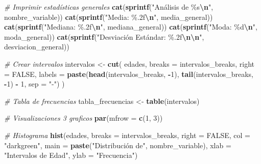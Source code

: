 \documentclass[
]{article}
\newenvironment{Shaded}{\begin{snugshade}}{\end{snugshade}}
\newcommand{\AttributeTok}[1]{\textcolor[rgb]{0.13,0.29,0.53}{#1}}
\newcommand{\CommentTok}[1]{\textcolor[rgb]{0.56,0.35,0.01}{\textit{#1}}}
\newcommand{\ConstantTok}[1]{\textcolor[rgb]{0.56,0.35,0.01}{#1}}
\newcommand{\DecValTok}[1]{\textcolor[rgb]{0.00,0.00,0.81}{#1}}
\newcommand{\FunctionTok}[1]{\textcolor[rgb]{0.13,0.29,0.53}{\textbf{#1}}}
\newcommand{\NormalTok}[1]{#1}
\newcommand{\OtherTok}[1]{\textcolor[rgb]{0.56,0.35,0.01}{#1}}
\newcommand{\SpecialCharTok}[1]{\textcolor[rgb]{0.81,0.36,0.00}{\textbf{#1}}}
\newcommand{\StringTok}[1]{\textcolor[rgb]{0.31,0.60,0.02}{#1}}
\begin{document}
\begin{Shaded}
\begin{Highlighting}[]
  \CommentTok{\# Imprimir estadísticas generales}
  \FunctionTok{cat}\NormalTok{(}\FunctionTok{sprintf}\NormalTok{(}\StringTok{"Análisis de \%s}\SpecialCharTok{\textbackslash{}n}\StringTok{"}\NormalTok{, nombre\_variable))}
  \FunctionTok{cat}\NormalTok{(}\FunctionTok{sprintf}\NormalTok{(}\StringTok{"Media: \%.2f}\SpecialCharTok{\textbackslash{}n}\StringTok{"}\NormalTok{, media\_general))}
  \FunctionTok{cat}\NormalTok{(}\FunctionTok{sprintf}\NormalTok{(}\StringTok{"Mediana: \%.2f}\SpecialCharTok{\textbackslash{}n}\StringTok{"}\NormalTok{, mediana\_general))}
  \FunctionTok{cat}\NormalTok{(}\FunctionTok{sprintf}\NormalTok{(}\StringTok{"Moda: \%d}\SpecialCharTok{\textbackslash{}n}\StringTok{"}\NormalTok{, moda\_general))}
  \FunctionTok{cat}\NormalTok{(}\FunctionTok{sprintf}\NormalTok{(}\StringTok{"Desviación Estándar: \%.2f}\SpecialCharTok{\textbackslash{}n\textbackslash{}n}\StringTok{"}\NormalTok{, desviacion\_general))}
  
  
  \CommentTok{\# Crear intervalos}
\NormalTok{  intervalos }\OtherTok{\textless{}{-}} \FunctionTok{cut}\NormalTok{(}
\NormalTok{    edades, }
    \AttributeTok{breaks =}\NormalTok{ intervalos\_breaks, }
    \AttributeTok{right =} \ConstantTok{FALSE}\NormalTok{, }
    \AttributeTok{labels =} \FunctionTok{paste}\NormalTok{(}\FunctionTok{head}\NormalTok{(intervalos\_breaks, }\SpecialCharTok{{-}}\DecValTok{1}\NormalTok{), }\FunctionTok{tail}\NormalTok{(intervalos\_breaks, }\SpecialCharTok{{-}}\DecValTok{1}\NormalTok{) }\SpecialCharTok{{-}} \DecValTok{1}\NormalTok{, }\AttributeTok{sep =} \StringTok{"{-}"}\NormalTok{)}
\NormalTok{  )}
  
  \CommentTok{\# Tabla de frecuencias}
\NormalTok{  tabla\_frecuencias }\OtherTok{\textless{}{-}} \FunctionTok{table}\NormalTok{(intervalos)}
  
  \CommentTok{\# Visualizaciones 3 graficos}
  \FunctionTok{par}\NormalTok{(}\AttributeTok{mfrow =} \FunctionTok{c}\NormalTok{(}\DecValTok{1}\NormalTok{, }\DecValTok{3}\NormalTok{))}
  
  \CommentTok{\# Histograma}
  \FunctionTok{hist}\NormalTok{(edades, }
       \AttributeTok{breaks =}\NormalTok{ intervalos\_breaks, }
       \AttributeTok{right =} \ConstantTok{FALSE}\NormalTok{, }
       \AttributeTok{col =} \StringTok{"darkgreen"}\NormalTok{, }
       \AttributeTok{main =} \FunctionTok{paste}\NormalTok{(}\StringTok{"Distribución de"}\NormalTok{, nombre\_variable), }
       \AttributeTok{xlab =} \StringTok{"Intervalos de Edad"}\NormalTok{, }
       \AttributeTok{ylab =} \StringTok{"Frecuencia"}\NormalTok{)}
  

\end{Highlighting}
\end{Shaded}
\end{document}
